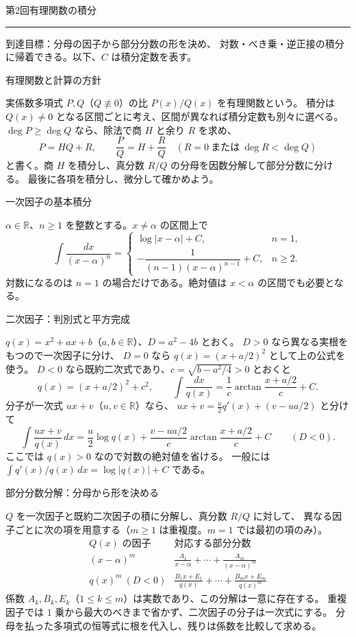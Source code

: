 \documentclass[a4paper,10pt,pdflatex,ja=standard,jafont=ipaex-type1,
  magstyle=real,scale=1]{bxjsarticle}
\newcommand{\handoutnumber}{2}
\newcommand{\handouttitle}[1]{%
  \begin{center}
    {\Large\color{ink}#1}\par\vspace{3mm}
    {\color{accent}\rule{0.88\linewidth}{0.7pt}}
  \end{center}\vspace{-2mm}}
\newcommand{\handout}[2]{%
  \renewcommand{\handoutnumber}{#1}%
  \handouttitle{第#1回\quad #2}}
\newcommand{\topic}[1]{\par\vspace{5pt}%
  {\large\sffamily\mdseries\color{accent}#1}\par\vspace{2pt}}
\newcommand{\keybox}[1]{\par\vspace{3pt}\begingroup
  \setlength{\fboxsep}{4pt}%
  \colorbox{soft}{\parbox{\dimexpr\linewidth-2\fboxsep\relax}{\small #1}}%
  \endgroup\par\vspace{2pt}}
\begin{document}
\fontsize{10pt}{13.5pt}\selectfont
\setlength{\abovedisplayskip}{4pt}
\setlength{\belowdisplayskip}{4pt}
\handout{2}{有理関数の積分}

\keybox{到達目標：分母の因子から部分分数の形を決め、
対数・べき乗・逆正接の積分に帰着できる。以下、$C$ は積分定数を表す。}

\topic{有理関数と計算の方針}
実係数多項式 $P,Q$（$Q\not\equiv0$）の比 $P(x)/Q(x)$ を有理関数という。
積分は $Q(x)\ne0$ となる区間ごとに考え、区間が異なれば積分定数も別々に選べる。
$\deg P\ge\deg Q$ なら、除法で商 $H$ と余り $R$ を求め、
$$
 P=HQ+R,\qquad \frac{P}{Q}=H+\frac{R}{Q}
 \quad(R=0\ \text{または}\ \deg R<\deg Q)
$$
と書く。商 $H$ を積分し、真分数 $R/Q$ の分母を因数分解して部分分数に分ける。
最後に各項を積分し、微分して確かめよう。

\topic{一次因子の基本積分}
$\alpha\in\mathbb R$、$n\ge1$ を整数とする。$x\ne\alpha$ の区間上で
$$
 \int\frac{dx}{(x-\alpha)^n}=
 \begin{cases}
  \log|x-\alpha|+C,&n=1,\\[3pt]
  -\dfrac{1}{(n-1)(x-\alpha)^{n-1}}+C,&n\ge2.
 \end{cases}
$$
対数になるのは $n=1$ の場合だけである。絶対値は $x<\alpha$ の区間でも必要となる。

\topic{二次因子：判別式と平方完成}
$q(x)=x^2+ax+b$（$a,b\in\mathbb R$）、$D=a^2-4b$ とおく。
$D>0$ なら異なる実根をもつので一次因子に分け、
$D=0$ なら $q(x)=(x+a/2)^2$ として上の公式を使う。
$D<0$ なら既約二次式であり、$c=\sqrt{b-a^2/4}>0$ とおくと
$$
 q(x)=(x+a/2)^2+c^2,\qquad
 \int\frac{dx}{q(x)}=\frac1c\arctan\frac{x+a/2}{c}+C.
$$
分子が一次式 $ux+v$（$u,v\in\mathbb R$）なら、
$ux+v=\tfrac u2q'(x)+(v-ua/2)$ と分けて
$$
 \int\frac{ux+v}{q(x)}\,dx
 =\frac u2\log q(x)+\frac{v-ua/2}{c}\arctan\frac{x+a/2}{c}+C
 \qquad(D<0).
$$
ここでは $q(x)>0$ なので対数の絶対値を省ける。
一般には $\int q'(x)/q(x)\,dx=\log|q(x)|+C$ である。

\topic{部分分数分解：分母から形を決める}
$Q$ を一次因子と既約二次因子の積に分解し、真分数 $R/Q$ に対して、
異なる因子ごとに次の項を用意する（$m\ge1$ は重複度。$m=1$ では最初の項のみ）。
$$
 \begin{array}{c|l}
  Q(x)\text{ の因子}&\text{対応する部分分数}\\
  \hline
  (x-\alpha)^m&\displaystyle
  \frac{A_1}{x-\alpha}+\cdots+\frac{A_m}{(x-\alpha)^m}\\[9pt]
  q(x)^m\ (D<0)&\displaystyle
  \frac{B_1x+E_1}{q(x)}+\cdots+\frac{B_mx+E_m}{q(x)^m}
 \end{array}
$$
係数 $A_k,B_k,E_k$（$1\le k\le m$）は実数であり、この分解は一意に存在する。
重複因子では $1$ 乗から最大のべきまで省かず、二次因子の分子は一次式にする。
分母を払った多項式の恒等式に根を代入し、残りは係数を比較して求める。
\end{document}
